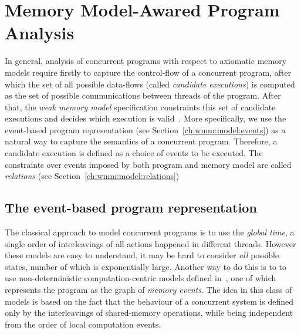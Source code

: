\chapter{Memory Model-Awared Program Analysis}
\label{ch:wmm}

In general, analysis of concurrent programs with respect to axiomatic memory models require firstly to capture the control-flow of a concurrent program, after which the set of all possible data-flows (called \textit{candidate executions}) is computed as the set of possible communications between threads of the program. After that, the \textit{weak memory model} specification constraints this set of candidate executions and decides which execution is valid~\cite{alglave2014herding}.
More specifically, we use the event-based program representation (see Section~\ref{ch:wmm:model:events}) as a natural way to capture the semantics of a concurrent program. Therefore, a candidate execution is defined as a choice of events to be executed. The constraints over events imposed by both program and memory model are called \textit{relations} (see Section~\ref{ch:wmm:model:relations})


\section{The event-based program representation}
\label{ch:wmm:event}


The classical approach to model concurrent programs is to use the \textit{global time}, a single order of interleavings of all actions happened in different threads. However these models are easy to understand, it may be hard to consider \textit{all} possible states, number of which is exponentially large. Another way to do this is to to use non-deterministic computation-centric models defined in~\cite{fri97}, one of which represents the program as the graph of \textit{memory events}. The idea in this class of models is based on the fact that the behaviour of a concurrent system is defined only by the interleavings of shared-memory operations, while being independent from the order of local computation events.


